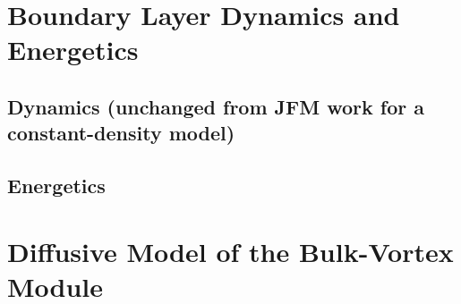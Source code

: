 \documentclass[preprint, prX]{revtex4}
\begin{document}
\section{Boundary Layer Dynamics and Energetics}

\subsection{Dynamics (unchanged from JFM work for a constant-density model)}

\subsection{Energetics}

\section{Diffusive Model of the Bulk-Vortex Module}

\begin{figure}[h!]
	\centering
	\def\svgwidth{0.7\columnwidth}
	
\end{figure}
\end{document}
